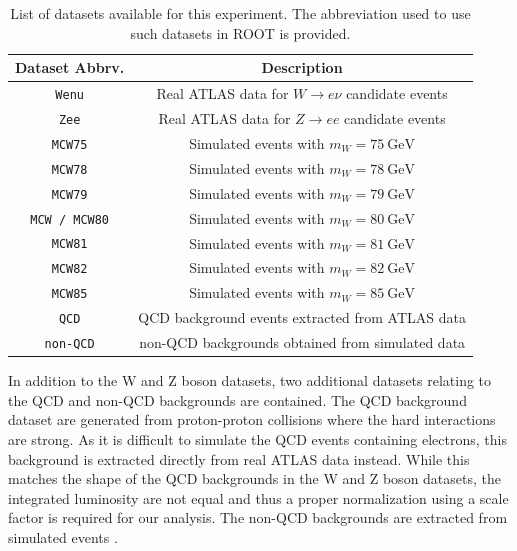 \documentclass[a4paper]{report}
\numberwithin{equation}{section}
\begin{document}
\begin{table}
    \centering
    \begin{tabular}{|c|c|}  \hline
     Dataset Abbrv.& Description    \\ \hline
     \texttt{Wenu} &  Real ATLAS data for  $W \rightarrow e\nu$ candidate events \\
     \texttt{Zee} &  Real ATLAS data for  $Z \rightarrow ee$ candidate events  \\ 
     \texttt{MCW75} &  Simulated events with $m_W = \SI{75}{\giga\electronvolt}$ \\ 
     \texttt{MCW78} &  Simulated events with $m_W = \SI{78}{\giga\electronvolt}$ \\ 
     \texttt{MCW79} &  Simulated events with $m_W = \SI{79}{\giga\electronvolt}$ \\ 
     \texttt{MCW / MCW80} &  Simulated events with $m_W = \SI{80}{\giga\electronvolt}$ \\ 
     \texttt{MCW81} &  Simulated events with $m_W = \SI{81}{\giga\electronvolt}$ \\ 
     \texttt{MCW82} &  Simulated events with $m_W = \SI{82}{\giga\electronvolt}$ \\ 
     \texttt{MCW85} &  Simulated events with $m_W = \SI{85}{\giga\electronvolt}$ \\ 
     \texttt{QCD} & QCD background events extracted from ATLAS data \\ 
     \texttt{non-QCD} & non-QCD backgrounds obtained from simulated data \\ \hline
    \end{tabular}
    \caption{List of datasets available for this experiment. The abbreviation used to use such datasets in ROOT is 
    provided.}
    \label{tab:datasets}
\end{table}

In addition to the W and Z boson datasets, two additional datasets relating to the QCD and non-QCD backgrounds are contained. The QCD
background dataset are generated from proton-proton collisions where the hard interactions are strong. As it is difficult to 
simulate the QCD events containing electrons, this background is extracted directly from real ATLAS data instead. While this matches the 
shape of the QCD backgrounds in the W and Z boson datasets, the integrated luminosity are not equal and thus a proper normalization
using a scale factor is required for our analysis. The non-QCD backgrounds are extracted from simulated events \cite{labman}. \par 
\end{document}
